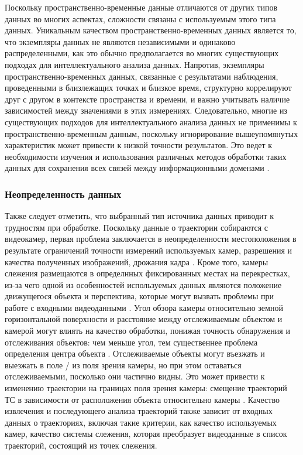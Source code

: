 Поскольку пространственно-временные данные отличаются от других типов данных во многих аспектах, сложности связаны с используемым этого типа данных. Уникальным качеством пространственно-временных данных является то, что экземпляры данных не являются независимыми и одинаково распределенными, как это обычно предполагается во многих существующих подходах для интеллектуального анализа данных. Напротив, экземпляры пространственно-временных данных, связанные с результатами наблюдения, проведенными в близлежащих точках и близкое время, структурно коррелируют друг с другом в контексте пространства и времени, и важно учитывать наличие зависимостей между значениями в этих измерениях. Следовательно, многие из существующих подходов для интеллектуального анализа данных не применимы к пространственно-временным данным, поскольку игнорирование вышеупомянутых характеристик может привести к низкой точности результатов. Это ведет к необходимости изучения и использования различных методов обработки таких данных для сохранения всех связей между информационными доменами \cite{article:1_survey_stdm}.

\subsubsection{Неопределенность данных}

Также следует отметить, что выбранный тип источника данных приводит к трудностям при обработке. Поскольку данные о траектории собираются с видеокамер, первая проблема заключается в неопределенности местоположения в результате ограничений точности измерений используемых камер, разрешения и качества полученных изображений, дрожания кадра \cite{article:4_detect_eatp}. Кроме того, камеры слежения размещаются в определнных фиксированных местах на перекрестках, из-за чего одной из особенностей используемых данных являются положение движущегося объекта и перспектива, которые могут вызвать проблемы при работе с входными видеоданными \cite{article:6_survey_anom_det_rtuvs}. Угол обзора камеры относительно земной горизонтальной поверхности и расстояние между отслеживаемым объектом и камерой могут влиять на качество обработки, понижая точность обнаружения и отслеживания объектов: чем меньше угол, тем существеннее проблема определения центра объекта \cite{article:4_detect_eatp}\cite{article:9_trb_vc_aev_sc}. Отслеживаемые объекты могут въезжать и выезжать в поле / из поля зрения камеры, но при этом оставаться отслеживаемыми, посколько они частично видны. Это может привести к изменению траектории на границах поля зрения камеры: смещение траекторий ТС в зависимости от расположения объекта относительно камеры \cite{article:4_detect_eatp}. Качество извлечения и последующего анализа траекторий также зависит от входных данных о траекториях, включая такие критерии, как качество используемых камер, качество системы слежения, которая преобразует видеоданные в список траекторий, состоящий из точек слежения.

